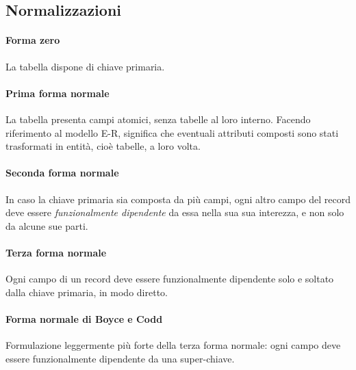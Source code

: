 \documentclass{article}
\begin{document}
    \subsection{Normalizzazioni}
        \paragraph{Forma zero} La tabella dispone di chiave primaria.
        \paragraph{Prima forma normale} La tabella presenta campi atomici, senza tabelle al loro interno. Facendo riferimento al modello E-R, significa che eventuali attributi composti sono stati trasformati in entità, cioè tabelle, a loro volta.
        \paragraph{Seconda forma normale} In caso la chiave primaria sia composta da più campi, ogni altro campo del record deve essere \textit{funzionalmente dipendente} da essa nella sua sua interezza, e non solo da alcune sue parti.
        \paragraph{Terza forma normale} Ogni campo di un record deve essere funzionalmente dipendente solo e soltato dalla chiave primaria, in modo diretto.
        \paragraph{Forma normale di Boyce e Codd} Formulazione leggermente più forte della terza forma normale: ogni campo deve essere funzionalmente dipendente da una super-chiave.
    
\end{document}

